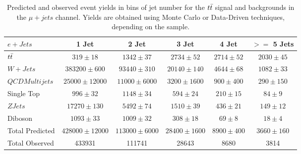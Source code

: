 \begin{table}
  \begin{tabular}{lccccc}
    \hline
    $e + Jets$ & 1 Jet & 2 Jet & 3 Jet & 4 Jet & $>=$ 5 Jets \\ 
    \hline
    $t\bar{t}$ & $319 \pm 18$ & $1342 \pm 37$ & $2734 \pm 52$ & $2714 \pm 52$ & $2030 \pm 45$ \\
    $W+Jets$ & $383200 \pm 600$ & $93440 \pm 310$ & $20140 \pm 140$ & $4644 \pm 68$ & $1082 \pm 33$ \\
    $QCD Multijets$ & $25000 \pm 12000$ & $11000 \pm 6000$ & $3200 \pm 1600$ & $900 \pm 400$ & $290 \pm 150$ \\
    Single Top & $996 \pm 32$ & $1148 \pm 34$ & $594 \pm 24$ & $210 \pm 15$ & $84 \pm 9$ \\
    $ZJets$ & $17270 \pm 130$ & $5492 \pm 74$ & $1510 \pm 39$ & $436 \pm 21$ & $149 \pm 12$ \\
    Diboson & $1093 \pm 33$ & $1009 \pm 32$ & $308 \pm 18$ & $69 \pm 8$ & $18 \pm 4$ \\
    \hline
    Total Predicted & $428000 \pm 12000$ & $113000 \pm 6000$ & $28400 \pm 1600$ & $8900 \pm 400$ & $3660 \pm 160$ \\
    Total Observed & 433931 & 111741 & 28643 & 8680 & 3814 \\
    \hline
  \end{tabular}
  \caption{Predicted and observed event yields in bins of jet number for the $t\bar{t}$ signal and backgrounds in the $\mu+jets$ channel.  Yields are obtained using Monte Carlo or Data-Driven techniques, depending on the sample.}
\end{table}


